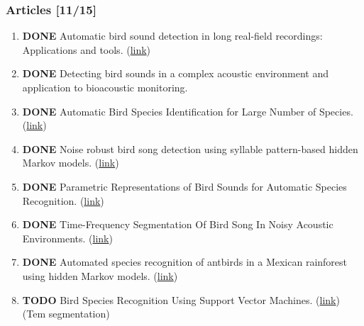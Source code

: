 \documentclass[11pt]{article}
\begin{document}
\subsubsection{Articles [11/15]}
\label{sec:orge17a72c}
\begin{enumerate}
\item {\bfseries\sffamily DONE} Automatic bird sound detection in long real-field recordings: Applications and tools. (\href{https://www.researchgate.net/profile/Klaus\_Riede/publication/260029691\_Automatic\_bird\_sound\_detection\_in\_long\_real-field\_recordings\_Applications\_and\_tools/links/0c96052ffd05bd7e9b000000.pdf}{link})
\label{sec:orgdff77b0}
\item {\bfseries\sffamily DONE} Detecting bird sounds in a complex acoustic environment and application to bioacoustic monitoring.
\label{sec:org7965de9}
\item {\bfseries\sffamily DONE} Automatic Bird Species Identification for Large Number of Species. (\href{http://www.ppgia.pucpr.br/\~alekoe/Papers/ISM2011-Koerich.pdf}{link})
\label{sec:orgab715a6}
\item {\bfseries\sffamily DONE} Noise robust bird song detection using syllable pattern-based hidden Markov models. (\href{http://www.seas.ucla.edu/spapl/weichu/docs/chu\_icassp\_11.pdf}{link})
\label{sec:org8d2f785}
\item {\bfseries\sffamily DONE} Parametric Representations of Bird Sounds for Automatic Species Recognition. (\href{https://www.researchgate.net/profile/Aki\_Haermae2/publication/3457694\_Parametric\_Representations\_of\_Bird\_Sounds\_for\_Automatic\_Species\_Recognition/links/00b4952a75660c3e4a000000.pdf}{link})
\label{sec:orgdf7df44}
\item {\bfseries\sffamily DONE} Time-Frequency Segmentation Of Bird Song In Noisy Acoustic Environments. (\href{http://www.freewillworkshop.org/neal\_briggs\_raich\_fern\_2011.pdf}{link})
\label{sec:orgffcbf38}
\item {\bfseries\sffamily DONE} Automated species recognition of antbirds in a Mexican rainforest using hidden Markov models. (\href{https://pdfs.semanticscholar.org/5437/48ce97ffff396f92eba529aa16839f39ed0a.pdf}{link})
\label{sec:org5323587}
\item {\bfseries\sffamily TODO} Bird Species Recognition Using Support Vector Machines. (\href{http://download.springer.com/static/pdf/160/art\%253A10.1155\%252F2007\%252F38637.pdf?originUrl=http\%3A\%2F\%2Flink.springer.com\%2Farticle\%2F10.1155\%2F2007\%2F38637\&token2=exp=1491790433\~acl=\%2Fstatic\%2Fpdf\%2F160\%2Fart\%25253A10.1155\%25252F2007\%25252F38637.pdf\%3ForiginUrl\%3Dhttp\%253A\%252F\%252Flink.springer.com\%252Farticle\%252F10.1155\%252F2007\%252F38637*\~hmac=749b3e2e28a5682fbb69d7e97b689d4170c4b28491fc3205cd89570cd52cef37}{link}) (Tem segmentation)

\end{enumerate}
\end{document}
